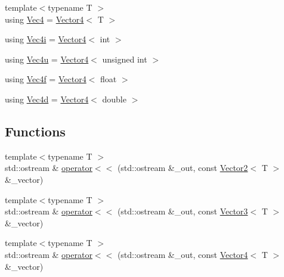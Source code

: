 \begin{DoxyCompactItemize}
\item 
{\footnotesize template$<$typename T $>$ }\\using \mbox{\hyperlink{namespacepad_1_1math_a97a1193114b33cea7a82ae656d507825}{Vec4}} = \mbox{\hyperlink{structpad_1_1math_1_1_vector4}{Vector4}}$<$ T $>$
\item 
using \mbox{\hyperlink{namespacepad_1_1math_a6b61fad19375a5164da9e1a86403f208}{Vec4i}} = \mbox{\hyperlink{structpad_1_1math_1_1_vector4}{Vector4}}$<$ int $>$
\item 
using \mbox{\hyperlink{namespacepad_1_1math_ad5b8d7d51edf8173f6a0ddbbb792c803}{Vec4u}} = \mbox{\hyperlink{structpad_1_1math_1_1_vector4}{Vector4}}$<$ unsigned int $>$
\item 
using \mbox{\hyperlink{namespacepad_1_1math_a4eb77014ac7b74bd24cf73bca82ac3a3}{Vec4f}} = \mbox{\hyperlink{structpad_1_1math_1_1_vector4}{Vector4}}$<$ float $>$
\item 
using \mbox{\hyperlink{namespacepad_1_1math_a845efb6de5d2237d1a7f27cf87741454}{Vec4d}} = \mbox{\hyperlink{structpad_1_1math_1_1_vector4}{Vector4}}$<$ double $>$
\end{DoxyCompactItemize}
\subsection*{Functions}
\begin{DoxyCompactItemize}
\item 
{\footnotesize template$<$typename T $>$ }\\std\+::ostream \& \mbox{\hyperlink{namespacepad_1_1math_aef2c4cef650688967cb74c75c5d4aafa}{operator$<$$<$}} (std\+::ostream \&\+\_\+out, const \mbox{\hyperlink{structpad_1_1math_1_1_vector2}{Vector2}}$<$ T $>$ \&\+\_\+vector)
\item 
{\footnotesize template$<$typename T $>$ }\\std\+::ostream \& \mbox{\hyperlink{namespacepad_1_1math_a9e468612d54c187ec0eaac48e304e673}{operator$<$$<$}} (std\+::ostream \&\+\_\+out, const \mbox{\hyperlink{structpad_1_1math_1_1_vector3}{Vector3}}$<$ T $>$ \&\+\_\+vector)
\item 
{\footnotesize template$<$typename T $>$ }\\std\+::ostream \& \mbox{\hyperlink{namespacepad_1_1math_aea739f95f7147095cec34ccedee7eea2}{operator$<$$<$}} (std\+::ostream \&\+\_\+out, const \mbox{\hyperlink{structpad_1_1math_1_1_vector4}{Vector4}}$<$ T $>$ \&\+\_\+vector)
\end{DoxyCompactItemize}


